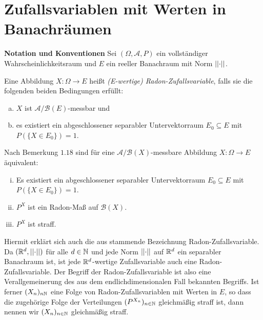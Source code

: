 \section{Zufallsvariablen mit Werten in Banachräumen}
\textbf{Notation und Konventionen} \newline
Sei $(\Omega, \mathcal{A}, P)$ ein vollständiger Wahrscheinlichkeitsraum und $E$ ein reeller Banachraum mit Norm $\lvert\lvert \cdot \rvert\rvert$. 
\begin{mydef}
    Eine Abbildung $X: \Omega \to E$ heißt \textit{(E-wertige) Radon-Zufallsvariable}, falls sie die folgenden beiden Bedingungen erfüllt: 
    \begin{enumerate}[(a)]
        \item $X$ ist $\mathcal{A}/\mathcal{B}(E)$-messbar und
        \item es existiert ein abgeschlossener separabler Untervektorraum $E_0 \subseteq E$ mit $P(\{X \in E_0\}) = 1$. 
    \end{enumerate}
\end{mydef}

\begin{remark}
    Nach Bemerkung $1.18$ sind für eine $\mathcal{A}/\mathcal{B}(X)$-messbare Abbildung $X: \Omega \to E$ äquivalent:
    \begin{enumerate}[(i)]
        \item Es existiert ein abgeschlossener separabler Untervektorraum $E_0 \subseteq E$ mit $P(\{X \in E_0\}) = 1$.
        \item $P^X$ ist ein Radon-Maß auf $\mathcal{B}(X)$. 
        \item $P^X$ ist straff. 
    \end{enumerate}
    Hiermit erklärt sich auch die aus \cite{ledoux-talagrand} stammende Bezeichnung Radon-Zufallsvariable. \newline 
    Da $(\mathbb{R}^d, \lvert\lvert \cdot \rvert\rvert)$ für alle $d \in \mathbb{N}$  und jede Norm $\lvert\lvert \cdot \rvert\rvert$ auf $\mathbb{R}^d$ ein separabler Banachraum ist, ist jede $\mathbb{R}^d$-wertige Zufallsvariable auch eine Radon-Zufallsvariable. 
    Der Begriff der Radon-Zufallsvariable ist also eine Verallgemeinerung des aus dem endlichdimensionalen Fall bekannten Begriffs. \newline
    Ist ferner $(X_n)_{n \mathbb{N}}$ eine Folge von Radon-Zufallsvariablen mit Werten in $E$, so dass die zugehörige Folge der Verteilungen $(P^{X_n})_{n \in \mathbb{N}}$ gleichmäßig straff ist, dann nennen wir $(X_n)_{n \in \mathbb{N}}$ gleichmäßig straff. 

\end{remark}

